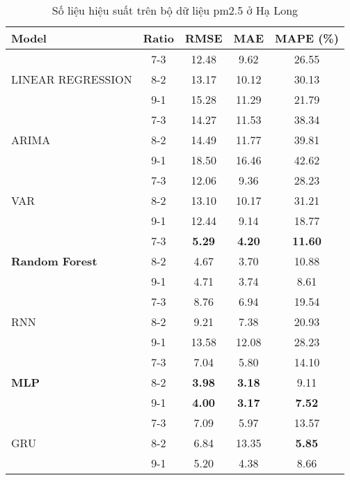 \begin{table}[h!]
    \centering
    \renewcommand{\arraystretch}{1.01}
    \caption{Số liệu hiệu suất trên bộ dữ liệu pm2.5 ở Hạ Long}
    \begin{tabular}{|l|c|c|c|c|}
    \hline
    \rowcolor{orange!30} \textbf{Model} & \textbf{Ratio} & \textbf{RMSE} & \textbf{MAE} & \textbf{MAPE (\%)} \\ \hline
    \rowcolor{white}  & 7-3 & 12.48 & 9.62 & 26.55 \\ 
    \rowcolor{white}  LINEAR REGRESSION & 8-2 & 13.17 & 10.12 & 30.13 \\ 
    \rowcolor{white}  & 9-1 & 15.28 & 11.29 & 21.79 \\ \hline
    \rowcolor{white}  & 7-3 & 14.27 & 11.53 & 38.34 \\ 
    \rowcolor{white} ARIMA & 8-2 & 14.49 & 11.77 & 39.81 \\ 
    \rowcolor{white}  & 9-1 & 18.50 & 16.46 & 42.62 \\ \hline
    \rowcolor{white}  & 7-3 & 12.06 & 9.36 & 28.23 \\
    \rowcolor{white} VAR & 8-2 & 13.10 & 10.17 & 31.21 \\ 
    \rowcolor{white}  & 9-1 & 12.44 & 9.14 & 18.77 \\ \hline
    \rowcolor{white} & 7-3 & \textbf{5.29} & \textbf{4.20} & \textbf{11.60} \\ 
    \rowcolor{white} \textbf{Random Forest} & 8-2 & 4.67 & 3.70 & 10.88 \\ 
    \rowcolor{white} & 9-1 & 4.71 & 3.74 & 8.61 \\ \hline
    \rowcolor{white}  & 7-3 & 8.76 & 6.94 & 19.54 \\ 
    \rowcolor{white} RNN & 8-2 & 9.21 & 7.38 & 20.93 \\ 
    \rowcolor{white}  & 9-1 & 13.58 & 12.08 & 28.23 \\ \hline
    \rowcolor{white}  & 7-3 & 7.04 & 5.80 & 14.10 \\ 
    \rowcolor{white} \textbf{MLP} & 8-2 & \textbf{3.98} & \textbf{3.18} & 9.11 \\ 
    \rowcolor{white}  & 9-1 & \textbf{4.00}  & \textbf{3.17} & \textbf{7.52}  \\ \hline
    \rowcolor{white}  & 7-3 & 7.09 & 5.97 & 13.57\\
    \rowcolor{white} GRU & 8-2 & 6.84 & 13.35 & \textbf{5.85}  \\ 
    \rowcolor{white}  & 9-1 & 5.20 & 4.38 & 8.66 \\ \hline

\end{tabular}
\end{table}
